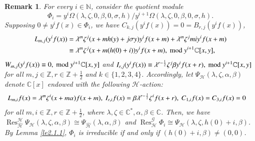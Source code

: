 \documentclass[12pt,reqno]{amsart}
\def\Z{\mathbb{Z}}
\def\N{\mathbb{N}}
\def\C{\mathbb{C}}
\numberwithin{equation}{section}
\newtheorem{rema}[theo]{Remark}
\begin{document}

\begin{rema}
    For every $i\in\N$, consider the quotient module
 \[
     \Phi_i=y^i\Omega(\lambda,\zeta, 0,\beta,0,\sigma,h)/ y^{i+1}\Omega(\lambda,\zeta, 0,\beta,0,\sigma,h).
 \] Supposing $0\neq y^{i}f(x)\in \Phi_i$, 
 we have $C_{k,j}(y^{i}f(x))=0=B_{r,j}(y^{i}f(x))$,
\begin{equation*}
\aligned
L_{m,j}(y^{i}f(x)) &= \lambda^{m}\zeta^j(x+mh(y)+j\sigma y)y^{i}f(x+m)+\lambda^{m}\zeta^jmiy^{i}f(x+m) \\
&\equiv \lambda^{m}\zeta^j(x+m(h(0)+i))y^{i}f(x+m),\  {\rm mod} 
\ y^{i+1}\mathbb{C}[x, y],
\endaligned
\end{equation*}
$W_{m,j}(y^{i}f(x)) \equiv 0,\  {\rm mod} 
\ y^{i+1}\mathbb{C}[x, y]$ and $I_{r,j}(y^{i}f(x)) \equiv \lambda^{r-\frac{1}{2}}\zeta^j\beta y^{i}f(x+r),\  {\rm mod} 
\ y^{i+1}\mathbb{C}[x, y]$
for all $m,j\in\Z, r\in\Z+\frac{1}{2}$ and $k\in\{1,2,3,4\}$. 
Accordingly, let $\Psi_{\mathcal{H}}(\lambda,\zeta,\alpha,\beta)$ denote $\C[x]$ endowed with the following ${\mathcal{H}}$-action:
\begin{equation*}
\aligned
L_{m,i}f(x)&=\lambda^m\zeta^i(x+m\alpha)f(x+m),\
I_{r,i}f(x)=\beta\lambda^{r-\frac{1}{2}}\zeta^if(x+r),\
C_{1,i} f(x)= C_{3,i} f(x) =0
\endaligned
\end{equation*}
for all $m,i\in\Z,r\in\Z+\frac{1}{2}$, where $\lambda,\zeta\in\C^*,\alpha,\beta\in\C$. Then, we have $\operatorname{Res}_{\hat{\mathcal{H}}}^{\mathcal{H}}\Psi_{\mathcal{H}}(\lambda,\zeta,\alpha,\beta)\cong \Psi_{\hat{\mathcal{H}}}(\lambda,\alpha,\beta)$ and
 $\operatorname{Res}_{\mathcal{H}}^{\mathcal{G}}\Phi_i
     \cong \Psi_{\mathcal{H}}(\lambda,\zeta,h(0)+i,\beta)$.
By Lemma \ref{le2.1.1}, $\Phi_i$ is irreducible if and only if $(h(0)+i,\beta)\neq (0,0)$.
\end{rema}
\end{document}
